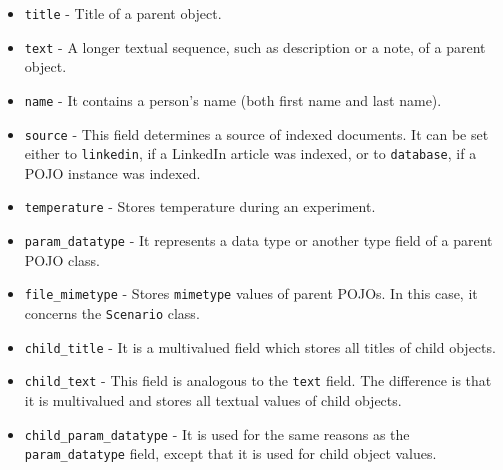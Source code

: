 \begin{itemize}
	\item \texttt{title} - Title of a parent object.
	
	\item \texttt{text} - A longer textual sequence, such as description or a note, of a parent object.
	
	\item \texttt{name} - It contains a person's name (both first name and last name).
	
	\item \texttt{source} - This field determines a source of indexed documents. It can be set either to \texttt{linkedin}, if a LinkedIn article was indexed, or to \texttt{database}, if a POJO instance was indexed. 
	
	\item \texttt{temperature} - Stores temperature during an experiment.
	
	\item \texttt{param\_datatype} - It represents a data type or another type field of a parent POJO class.
	
	\item \texttt{file\_mimetype} - Stores \texttt{mimetype} values of parent POJOs. In this case, it concerns the \texttt{Scenario} class.
	
	\item \texttt{child\_title} - It is a multivalued field which stores all titles of child objects.
	
	\item \texttt{child\_text} - This field is analogous to the \texttt{text} field. 
	The difference is that it is multivalued and stores all textual values of child objects.
	
	\item \texttt{child\_param\_datatype} - It is used for the same reasons as the \texttt{param\_datatype} field, except that it is used for child object values.
	
\end{itemize}



